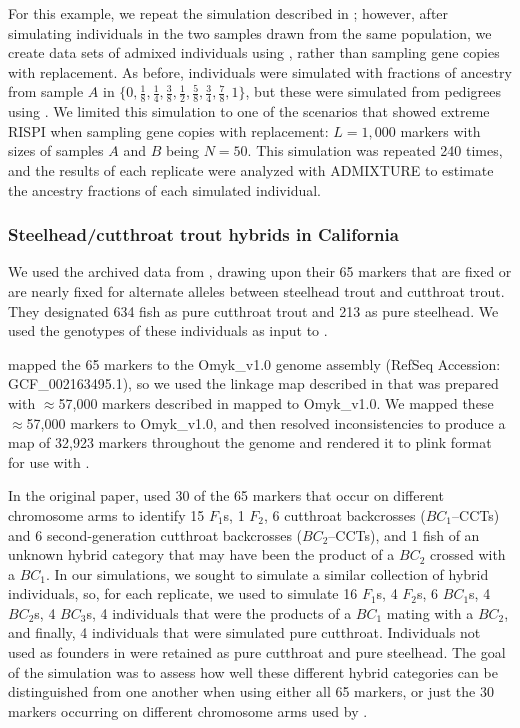 {For this example, we repeat the simulation described in {\em {}};
however, after simulating individuals in the two samples drawn from the same population,
we create data sets of admixed individuals using \gscramble{}, rather than sampling
gene copies with replacement.  As before, individuals were simulated with fractions of
ancestry from sample $A$ in $\{0, \frac{1}{8}, \frac{1}{4}, \frac{3}{8}, \frac{1}{2}, \frac{5}{8}, \frac{3}{4}, \frac{7}{8}, 1\}$, but these were simulated from pedigrees using \gscramble{}.  We limited
this simulation to one of the scenarios that showed extreme RISPI when sampling gene
copies with replacement: $L=1,000$ markers with sizes of samples $A$ and $B$ being
$N=50$. This simulation was repeated 240 times, and the results of each replicate were analyzed with
ADMIXTURE to estimate the ancestry fractions of each simulated individual.

\subsubsection*{Steelhead/cutthroat trout hybrids in California}

We used the archived data from \citet{rizza2023limited}, drawing upon their 65 markers
that are fixed or are nearly fixed for alternate alleles between steelhead trout and cutthroat trout.
They designated 634 fish as pure cutthroat trout and 213 as pure steelhead.  We used the
genotypes of these individuals as input to \gscramble{}.

\citeauthor{rizza2023limited} mapped the 65 markers to the Omyk\_v1.0 genome assembly (RefSeq 
Accession: GCF\_002163495.1), so we used
the linkage map described in \citep{pearse2019sex} that was prepared 
with $\approx$57,000 markers described in \citet{palti2015development} mapped to Omyk\_v1.0. We mapped these $\approx$57,000 markers to Omyk\_v1.0, and then resolved inconsistencies to produce a map
of 32,923 markers throughout the genome and rendered it to plink format for use with \gscramble{}.

In the original paper, \citet{rizza2023limited} used 30 of the 65 markers that
occur on different chromosome arms to identify 15 $F_1$s,
1 $F_2$,
6 cutthroat backcrosses ($BC_1$--CCTs) and 
6 second-generation cutthroat backcrosses ($BC_2$--CCTs),
and 1 fish of an unknown hybrid category that may have been the
product of a $BC_2$ crossed with a $BC_1$.   In our simulations, we sought to simulate
a similar collection of hybrid individuals, so, for each replicate, we used
\gscramble{} to simulate 16 $F_1$s, 4 $F_2$s, 6 $BC_1$s, 4 $BC_2$s, 4 $BC_3$s,  4 individuals
that were the products of a $BC_1$ mating with a $BC_2$, and finally, 4 individuals that were simulated pure cutthroat. Individuals not used as founders
in \gscramble{} were retained as pure cutthroat and pure steelhead.  The goal of the simulation
was to assess how well these different hybrid categories can be distinguished from one another
when using either all 65 markers, or just the 30 markers occurring on different chromosome arms
used by  \citet{rizza2023limited}.

}

